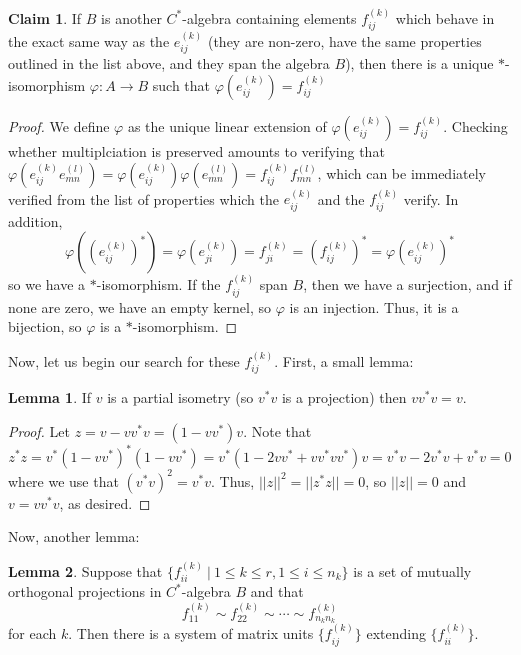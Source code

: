 \documentclass[aps,pra,showpacs,notitlepage,onecolumn,superscriptaddress,nofootinbib]{revtex4-1}
\theoremstyle{definition}
\newtheorem{lemma}{Lemma}[section]
\newtheorem{claim}{Claim}[section]
\begin{document}
\begin{claim}
  \label{claim:iso}
  If $B$ is another $C^{*}$-algebra containing elements $f_{ij}^{(k)}$ which behave in the exact same way as the $e_{ij}^{(k)}$ (they are non-zero, have the same properties outlined in the list above,
  and they span the algebra $B$), then there is a unique $*$-isomorphism $\varphi : A \rightarrow B$ such that $\varphi(e_{ij}^{(k)}) = f_{ij}^{(k)}$
\end{claim}
\begin{proof}
  We define $\varphi$ as the unique linear extension of $\varphi(e_{ij}^{(k)}) = f_{ij}^{(k)}$. Checking whether multiplciation is preserved amounts to verifying
  that $\varphi(e_{ij}^{(k)} e_{mn}^{(l)}) = \varphi(e_{ij}^{(k)}) \varphi(e_{mn}^{(l)}) = f_{ij}^{(k)} f_{mn}^{(l)}$, which can be immediately verified from
  the list of properties which the $e_{ij}^{(k)}$ and the $f_{ij}^{(k)}$ verify. In addition,
  \begin{equation}
  \varphi((e_{ij}^{(k)})^*) = \varphi(e_{ji}^{(k)}) = f_{ji}^{(k)} = (f_{ij}^{(k)})^{*} = \varphi(e_{ij}^{(k)})^{*}
  \end{equation}
  so we have a $*$-isomorphism. If the $f_{ij}^{(k)}$ span $B$, then we have a surjection, and if none are zero, we have an empty kernel, so $\varphi$ is an injection.
  Thus, it is a bijection, so $\varphi$ is a $*$-isomorphism.
\end{proof}

\noindent Now, let us begin our search for these $f_{ij}^{(k)}$. First, a small lemma:

\begin{lemma}
If $v$ is a partial isometry (so $v^{*} v$ is a projection) then $v v^{*} v = v$.
\end{lemma}
\begin{proof}
  Let $z = v - v v^{*} v = (1 - v v^{*})v$. Note that
  \begin{equation}
    z^{*} z = v^{*} (1 - v v^{*})^{*} (1 - v v^{*}) = v^{*} (1 - 2 v v^{*} +  v v^{*} v v^{*}) v = v^{*} v - 2 v^{*} v + v^{*} v = 0
  \end{equation}
  where we use that $(v^{*} v)^2 = v^{*} v$. Thus, $||z||^2 = ||z^{*} z|| = 0$, so $||z|| = 0$ and $v = v v^{*} v$, as desired.
  \end{proof}

\noindent Now, another lemma:

\begin{lemma}
  Suppose that $\{f_{ii}^{(k)} \ | \ 1 \leq k \leq r, 1 \leq i \leq n_k\}$ is a set of mutually orthogonal projections in $C^{*}$-algebra $B$ and that
  \begin{equation}
    f_{11}^{(k)} \sim f_{22}^{(k)} \sim \cdots \sim f_{n_k n_k}^{(k)}
  \end{equation}
  for each $k$. Then there is a system of matrix units $\{f_{ij}^{(k)}\}$ extending $\{f_{ii}^{(k)}\}$.
\end{lemma}
\end{document}
